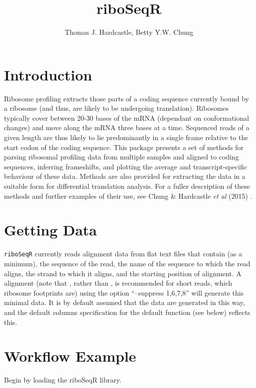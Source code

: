 \documentclass[a4paper]{article}
\title{riboSeqR}
\author{Thomas J. Hardcastle, Betty Y.W. Chung}
\begin{document}
\maketitle

\section*{Introduction}

Ribosome profiling extracts those parts of a coding sequence currently bound by a ribosome (and thus, are likely to be undergoing translation). Ribosomes typically cover between 20-30 bases of the mRNA (dependant on conformational changes) and move along the mRNA three bases at a time. Sequenced reads of a given length are thus likely to lie predominantly in a single frame relative to the start codon of the coding sequence. This package presents a set of methods for parsing ribosomal profiling data from multiple samples and aligned to coding sequences, inferring frameshifts, and plotting the average and transcript-specific behaviour of these data. Methods are also provided for extracting the data in a suitable form for differential translation analysis. For a fuller description of these methods and further examples of their use, see Chung \& Hardcastle \textsl{et al} (2015) \cite{chung}.

\section*{Getting Data}

\verb'riboSeqR' currently reads alignment data from flat text files that contain (as a minimum), the sequence of the read, the name of the sequence to which the read aligns, the strand to which it aligns, and the starting position of alignment. A  alignment (note that , rather than , is recommended for short reads, which ribosome footprints are) using the option ``--suppress 1,6,7,8'' will generate this minimal data. It is by default assumed that the data are generated in this way, and the default columns specification for the default  function (see below) reflects this.

\section*{Workflow Example}

Begin by loading the riboSeqR library.
\end{document}

